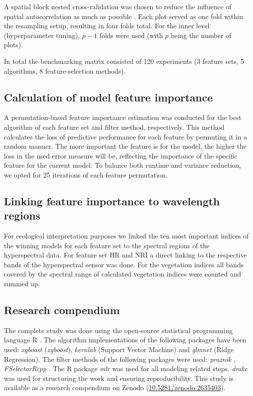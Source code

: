 \documentclass[letterpaper, journal]{IEEEtran}
\begin{document}
\noindent A spatial block nested cross-validation was chosen to reduce the influence of spatial autocorrelation as much as possible \cite{schratz2019, sperrorest}.
Each plot served as one fold within the resampling setup, resulting in four folds total.
For the inner level (hyperparameter tuning), $p - 1$ folds were used (with $p$ being the number of plots).

In total the benchmarking matrix consisted of 120 experiments (3 feature sets, 5 algorithms, 8 feature-selection methods).

\subsection{Calculation of model feature importance}
\noindent A permutation-based feature importance estimation was conducted for the best algorithm of each feature set and filter method, respectively.
This method calculates the loss of predictive performance for each feature by permuting it in a random manner.
The more important the feature is for the model, the higher the loss in the used error measure will be, reflecting the importance of the specific feature for the current model.
To balance both runtime and variance reduction, we opted for 25 iterations of each feature permutation.

\subsection{Linking feature importance to wavelength regions}
\noindent For ecological interpretation purposes we linked the ten most important indices of the winning models for each feature set to the spectral regions of the hyperspectral data.
For feature set HR and NRI a direct linking to the respective bands of the hyperspectral sensor was done.
For the vegetation indices all bands covered by the spectral range of calculated vegetation indices were counted and summed up.

\subsection{Research compendium}

\noindent The complete study was done using the open-source statistical programming language R \cite{rcoreteam2018}.
The algorithm implementations of the following packages have been used: \textit{xgboost} \cite{chen2016} (\textit{xgboost}), \textit{kernlab} \cite{kernlab} (Support Vector Machine) and \textit{glmnet} \cite{glmnet} (Ridge Regression).
The filter methods of the following packages were used: \textit{praznik \cite{praznik}}, \textit{FSelectorRcpp} \cite{fselectorrcpp}.
The R package \textit{mlr} \cite{mlr} was used for all modeling related steps.
\textit{drake} was used for structuring the work and ensuring reproducibility.
This study is available as a research compendium on Zenodo (\url{10.5281/zenodo.2635403}).
\end{document}
